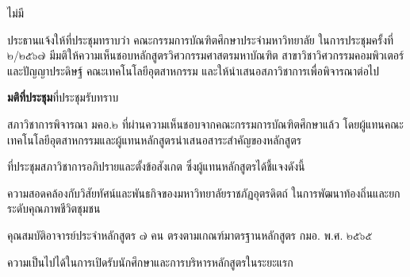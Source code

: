 \documentclass{meetingminutes}
\begin{document}
\maketitle

\begin{participants}
\end{participants}

\noindent ไม่มี\par

\startmeeting
{}


ประธานแจ้งให้ที่ประชุมทราบว่า คณะกรรมการบัณฑิตศึกษาประจำมหาวิทยาลัย ในการประชุมครั้งที่ ๒/๒๕๖๗
มีมติให้ความเห็นชอบหลักสูตรวิศวกรรมศาสตรมหาบัณฑิต สาขาวิชาวิศวกรรมคอมพิวเตอร์และปัญญาประดิษฐ์
คณะเทคโนโลยีอุตสาหกรรม และให้นำเสนอสภาวิชาการเพื่อพิจารณาต่อไป

\noindent\textbf{มติที่ประชุม}\quad ที่ประชุมรับทราบ


สภาวิชาการพิจารณา มคอ.๒ ที่ผ่านความเห็นชอบจากคณะกรรมการบัณฑิตศึกษาแล้ว
โดยผู้แทนคณะเทคโนโลยีอุตสาหกรรมและผู้แทนหลักสูตรนำเสนอสาระสำคัญของหลักสูตร

ที่ประชุมสภาวิชาการอภิปรายและตั้งข้อสังเกต ซึ่งผู้แทนหลักสูตรได้ชี้แจงดังนี้

\begin{thailist}
  \item ความสอดคล้องกับวิสัยทัศน์และพันธกิจของมหาวิทยาลัยราชภัฏอุตรดิตถ์
  ในการพัฒนาท้องถิ่นและยกระดับคุณภาพชีวิตชุมชน
  \item คุณสมบัติอาจารย์ประจำหลักสูตร ๗ คน ตรงตามเกณฑ์มาตรฐานหลักสูตร กมอ. พ.ศ. ๒๕๖๕
  \item ความเป็นไปได้ในการเปิดรับนักศึกษาและการบริหารหลักสูตรในระยะแรก
\end{thailist}
\end{document}
